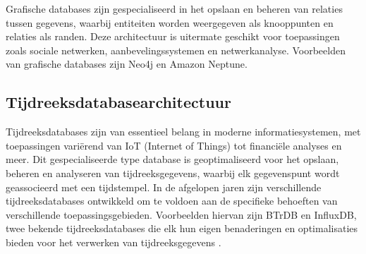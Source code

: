 Grafische databases zijn gespecialiseerd in het opslaan en beheren van relaties tussen gegevens, waarbij entiteiten worden weergegeven als knooppunten en relaties als randen. Deze architectuur is uitermate geschikt voor toepassingen zoals sociale netwerken, aanbevelingssystemen en netwerkanalyse. Voorbeelden van grafische databases zijn Neo4j en Amazon Neptune.

\begin{table}[h]
    \centering
    \caption{Overzicht van de specificaties van Neo4j \autocite{Neo4jDocumentation}}
\end{table}

\subsection{Tijdreeksdatabasearchitectuur}

Tijdreeksdatabases zijn van essentieel belang in moderne informatiesystemen, met toepassingen variërend van IoT (Internet of Things) tot financiële analyses en meer. Dit gespecialiseerde type database is geoptimaliseerd voor het opslaan, beheren en analyseren van tijdreeksgegevens, waarbij elk gegevenspunt wordt geassocieerd met een tijdstempel. In de afgelopen jaren zijn verschillende tijdreeksdatabases ontwikkeld om te voldoen aan de specifieke behoeften van verschillende toepassingsgebieden. Voorbeelden hiervan zijn BTrDB en InfluxDB, twee bekende tijdreeksdatabases die elk hun eigen benaderingen en optimalisaties bieden voor het verwerken van tijdreeksgegevens \autocite{Yang2019EdgeDBAE}.

